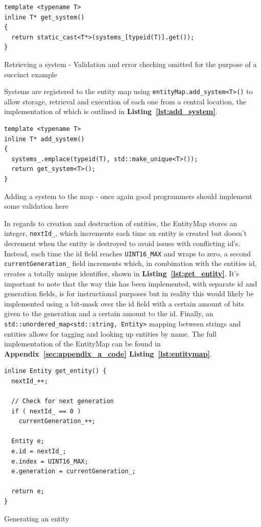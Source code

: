 \documentclass[10pt]{scrartcl}
\begin{document}
	\begin{listing}[H]
	\begin{verbatim}
template <typename T>
inline T* get_system()
{
  return static_cast<T*>(systems_[typeid(T)].get());
}
	\end{verbatim}
	\caption{Retrieving a system - Validation and error checking omitted for the purpose of a succinct example}
	\label{lst:get_system}
	\end{listing}

	Systems are registered to the entity map using \texttt{entityMap.add_system<T>()} to allow storage, retrieval and execution of each one from a central location, the implementation of which is outlined in \textbf{Listing~\ref{lst:add_system}}.

	\begin{listing}[H]
	\begin{verbatim}
template <typename T>
inline T* add_system()
{
  systems_.emplace(typeid(T), std::make_unique<T>());
  return get_system<T>();
}
	\end{verbatim}
	\caption{Adding a system to the map - once again good programmers should implement some validation here}
	\label{lst:add_system}
	\end{listing}

	In regards to creation and destruction of entities, the EntityMap stores an integer, \texttt{nextId_}, which increments each time an entity is created but doesn't decrement when the entity is destroyed to avoid issues with conflicting id's. Instead, each time the id field reaches \texttt{UINT16_MAX} and wraps to zero, a second \texttt{currentGeneration_} field increments which, in combination with the entities id, creates a totally unique identifier, shown in \textbf{Listing~\ref{lst:get_entity}}. It's important to note that the way this has been implemented, with separate id and generation fields, is for instructional purposes but in reality this would likely be implemented using a bit-mask over the id field with a certain amount of bits given to the generation and a certain amount to the id. Finally, an \texttt{std::unordered_map<std::string, Entity>} mapping between strings and entities allows for tagging and looking up entities by name. The full implementation of the EntityMap can be found in \textbf{Appendix~\ref{sec:appendix_a_code} Listing~\ref{lst:entitymap}}.

	\begin{listing}[H]
	\begin{verbatim}
inline Entity get_entity() {
  nextId_++;

  // Check for next generation
  if ( nextId_ == 0 )
    currentGeneration_++;

  Entity e;
  e.id = nextId_;
  e.index = UINT16_MAX;
  e.generation = currentGeneration_;

  return e;
}
	\end{verbatim}
	\caption{Generating an entity}
	\label{lst:get_entity}
	\end{listing}
\end{document}
